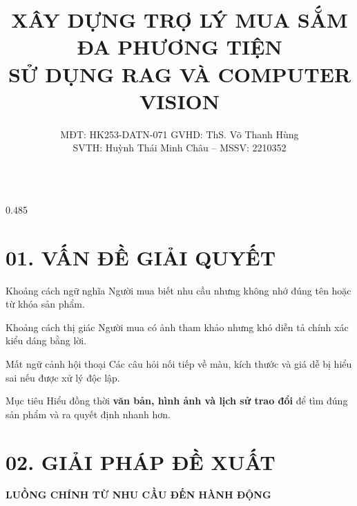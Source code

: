 \documentclass[final]{beamer}
\title[AI hỗ trợ quyết định. Dữ liệu nghiệp vụ giữ quyền kiểm soát.]{%
XÂY DỰNG TRỢ LÝ MUA SẮM ĐA PHƯƠNG TIỆN\\[0.25ex]
SỬ DỤNG RAG VÀ COMPUTER VISION}
\author{%
MĐT: HK253-DATN-071 \quad \textbullet \quad GVHD: ThS. Võ Thanh Hùng\\[0.2ex]
SVTH: Huỳnh Thái Minh Châu -- MSSV: 2210352}
\begin{document}
\begin{frame}[t]
\begin{columns}[t,totalwidth=\textwidth]

\begin{column}{0.485\textwidth}
\justifying

\section{01. VẤN ĐỀ GIẢI QUYẾT}

\begin{block}{Khoảng cách ngữ nghĩa}
Người mua biết nhu cầu nhưng không nhớ đúng tên hoặc từ khóa sản phẩm.
\end{block}

\begin{block}{Khoảng cách thị giác}
Người mua có ảnh tham khảo nhưng khó diễn tả chính xác kiểu dáng bằng lời.
\end{block}

\begin{block}{Mất ngữ cảnh hội thoại}
Các câu hỏi nối tiếp về màu, kích thước và giá dễ bị hiểu sai nếu được xử lý độc lập.
\end{block}

\begin{alertblock}{Mục tiêu}
Hiểu đồng thời \textbf{văn bản, hình ảnh và lịch sử trao đổi} để tìm đúng sản phẩm và ra quyết định nhanh hơn.
\end{alertblock}

\vspace{0.55cm}
\section{02. GIẢI PHÁP ĐỀ XUẤT}

\begin{center}
{\color{posterBlue}\Large\bfseries LUỒNG CHÍNH TỪ NHU CẦU ĐẾN HÀNH ĐỘNG}

\vspace{0.55cm}


\end{center}
\end{column}
\end{columns}
\end{frame}
\end{document}
